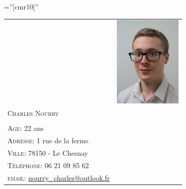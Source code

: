 \documentclass[a4paper,10pt]{article}
\begin{document}
\pagestyle{empty} %

\font\fb=''[cmr10]'' %




  \begin{tabular}{ p{11.5cm}r }
   & \multirow{2}{*}{\includegraphics[width=1.3in]{pic}}\\
   \\
   \scshape{\Huge{Charles Nourry}} & \\
   \\
   \textsc{Age:} 22 ans &\\
    \textsc{Adresse:} 1 rue de la ferme &\\
    \textsc{Ville:} 78150 - Le Chesnay&\\
    \textsc{Téléphone:} 06 21 09 85 62&\\
    \textsc{email:} \href{mailto:nourry\_charles@outlook.fr}{nourry\_charles@outlook.fr}& %
  \end{tabular}
  
  \vspace{0.1in}


\end{document}
